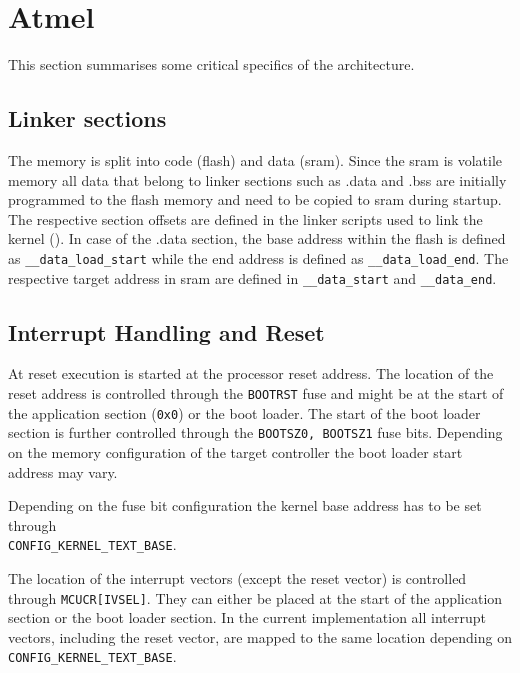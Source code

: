 \section{Atmel \avr}
	This section summarises some critical specifics of the \avr architecture.

	\subsection{Linker sections}
		The \avr memory is split into code (flash) and data (\gls{sram}). Since the \gls{sram} is volatile memory all data that belong to linker sections such as .data and .bss are initially programmed to the flash memory and need to be copied to \gls{sram} during startup. The respective section offsets are defined in the linker scripts used to link the kernel (). In case of the .data section, the base address within the flash is defined as \lstinline{__data_load_start} while the end address is defined as \lstinline{__data_load_end}. The respective target address in \gls{sram} are defined in \lstinline{__data_start} and \lstinline{__data_end}.

	\subsection{Interrupt Handling and Reset}
		At reset execution is started at the processor reset address. The location of the reset address is controlled through the \lstinline{BOOTRST} fuse and might be at the start of the application section (\lstinline{0x0}) or the boot loader. The start of the boot loader section is further controlled through the \lstinline{BOOTSZ0, BOOTSZ1} fuse bits. Depending on the memory configuration of the target controller the boot loader start address may vary.
		
		Depending on the fuse bit configuration the kernel base address has to be set through\\\lstinline{CONFIG_KERNEL_TEXT_BASE}. 

		The location of the interrupt vectors (except the reset vector) is controlled through \lstinline{MCUCR[IVSEL]}. They can either be placed at the start of the application section or the boot loader section. In the current implementation all interrupt vectors, including the reset vector, are mapped to the same location depending on \lstinline{CONFIG_KERNEL_TEXT_BASE}.
